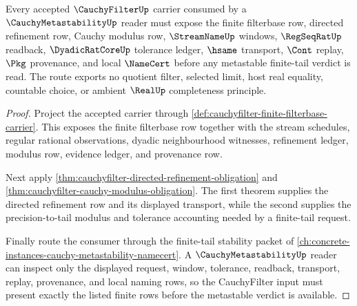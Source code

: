 \begin{theorem}
\label{thm:cauchyfilter-metastability-consumer-route}
Every accepted $\CauchyFilterUp$ carrier consumed by a $\CauchyMetastabilityUp$ reader must expose the finite filterbase row, directed refinement row, Cauchy modulus row, $\StreamNameUp$ windows, $\RegSeqRatUp$ readback, $\DyadicRatCoreUp$ tolerance ledger, $\hsame$ transport, $\Cont$ replay, $\Pkg$ provenance, and local $\NameCert$ before any metastable finite-tail verdict is read. The route exports no quotient filter, selected limit, host real equality, countable choice, or ambient $\RealUp$ completeness principle.
\end{theorem}
\begin{proof}
Project the accepted carrier through \autoref{def:cauchyfilter-finite-filterbase-carrier}. This exposes the finite filterbase row together with the stream schedules, regular rational observations, dyadic neighbourhood witnesses, refinement ledger, modulus row, evidence ledger, and provenance row.

Next apply \autoref{thm:cauchyfilter-directed-refinement-obligation} and \autoref{thm:cauchyfilter-cauchy-modulus-obligation}. The first theorem supplies the directed refinement row and its displayed transport, while the second supplies the precision-to-tail modulus and tolerance accounting needed by a finite-tail request.

Finally route the consumer through the finite-tail stability packet of \autoref{ch:concrete-instances-cauchy-metastability-namecert}. A $\CauchyMetastabilityUp$ reader can inspect only the displayed request, window, tolerance, readback, transport, replay, provenance, and local naming rows, so the CauchyFilter input must present exactly the listed finite rows before the metastable verdict is available.
\end{proof}

